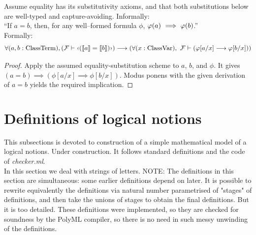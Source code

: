 \begin{metatheorem}%
Assume equality has its substitutivity axioms, and that both substitutions
below are well-typed and capture-avoiding. Informally:\\
``If $a = b$, then, for any well--formed formula $\phi$, $\varphi (a)\ \Longrightarrow\  \varphi (b)$.''\\
Formally:
\[
\forall (a,b:\ClassTerm), 
(\Fau\vdash \mquote{(\mantiquote{a}=\mantiquote{b})})
\implies
(\forall (x:\Class\Var),\ \Fau\vdash (\phi[a/x] \implies \phi[b/x]))
\]

\end{metatheorem}
\begin{proof}
Apply the assumed equality-substitution scheme to $a$, $b$, and $\phi$.
It gives $(a=b)\implies(\phi[a/x]\implies\phi[b/x])$. Modus ponens
with the given derivation of $a=b$ yields the required implication.
\end{proof}


\iffalse
\pagebreak

\section{Definitions of logical notions}%

This subsections is devoted to construction of a simple mathematical model of a logical notions. Under construction. It follows standard definitions and the code of \textit{checker.ml}.\\

In this section we deal with strings of letters.
NOTE: The definitions in this section are simultaneous: some earlier definitions depend on later. It is possible to rewrite equivalently the definitions via natural number parametrised of "stages" of definitions, and then take the unions of stages to obtain the final definitions. But it is too detailed. These definitions were implemented, so they are checked for soundness by the PolyML compiler, so there is no need in such messy unwinding of the definitions.




